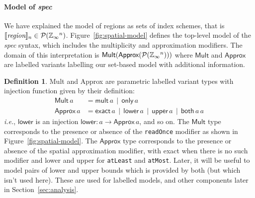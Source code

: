 \documentclass[9pt,preprint]{sigplanconf}
\newcounter{block}
\theoremstyle{definition}
\newtheorem{definition}[block]{Definition}
\newcommand{\ie}{\emph{i.e.}}
\newcommand{\interp}[1]{\llbracket{#1}\rrbracket}
\newcommand{\term}[1]{\texttt{#1}}
\begin{document}


\paragraph{Model of \textit{spec}}

We have explained the model of regions as sets of index
schemes, that is
$\interp{\textit{region}}_n \in \mathcal{P}(\domainVal{}^n)$.
Figure~\ref{fig:spatial-model} defines the top-level model of the
\textit{spec} syntax, which includes the multiplicity and
approximation modifiers. The domain of this interpretation
is $\textsf{Mult}(\textsf{Approx}(\mathcal{P}(\mathbb{Z}_\infty{}^n)))$
where $\textsf{Mult}$ and $\textsf{Approx}$ are labelled variants
labelling our set-based model with additional information.

\begin{definition} \textsf{Mult}
and \textsf{Approx} are parametric labelled variant types
with injection function given by their definition:
%
\begin{align*}
\textsf{Mult} \, a & = \textsf{mult} \, a \,\mid\, \textsf{only} \, a \\
\textsf{Approx} \, a & = \textsf{exact} \, a \,\mid\, \textsf{lower} \, a \,\mid\,
\textsf{upper} \, a \,\mid\, \textsf{both} \, a \, a
\end{align*}
\ie{}, $\mathsf{lower}$ is an injection $\mathsf{lower} : a \rightarrow \mathsf{Approx} \, a$, and so
on. The $\textsf{Mult}$ type corresponds to the presence or absence of the
\term{readOnce} modifier as shown in Figure~\ref{fig:spatial-model}. 
The $\textsf{Approx}$ type corresponds to the presence or absence of
the spatial approximation modifier, with \textsf{exact} when there is
no such modifier and \textsf{lower} and \textsf{upper} for
\term{atLeast} and \term{atMost}. Later, it will be useful to model
pairs of lower and upper bounds which is provided by \textsf{both} 
(but which isn't used here). These are used for labelled models, and other components later in
Section~\ref{sec:analysis}.%
\label{def:mult-and-approx}
\end{definition}
\vspace{-0.5em}
\end{document}
